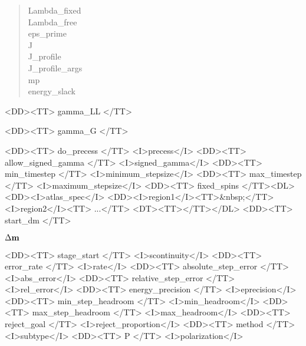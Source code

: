 \begin{description}
\begin{latexonly}
\begin{quote}
    \bi Lambda\_fixed          \\
    \bi Lambda\_free           \\
    \bi eps\_prime             \\
    \bi J                      \\
    \bi J\_profile             \\
    \bi J\_profile\_args       \\
    \bi mp                     \\
    \bi energy\_slack          \\
   \ccb
   \end{quote}
   \end{latexonly}%
   \begin{htmlonly}
   \begin{rawhtml}<BLOCKQUOTE><DL><DT>
   <TT>Specify Oxs_SpinXferEvolve:</TT><I>name</I> <TT>{</TT>
   <DD><TT> alpha </TT>
   \end{rawhtml}
   \abovemath{\alpha}
   \begin{rawhtml}
   <DD><TT> gamma_LL </TT>
   \end{rawhtml}
   \abovemath{\bar{\gamma}}
   \begin{rawhtml}
   <DD><TT> gamma_G </TT>
   \end{rawhtml}
   \abovemath{\gamma}
   \begin{rawhtml}
   <DD><TT> do_precess </TT> <I>precess</I>
   <DD><TT> allow_signed_gamma </TT> <I>signed_gamma</I>
   <DD><TT> min_timestep </TT> <I>minimum_stepsize</I>
   <DD><TT> max_timestep </TT> <I>maximum_stepsize</I>
   <DD><TT> fixed_spins {</TT><DL>
       <DD><I>atlas_spec</I>
       <DD><I>region1</I><TT>&nbsp;</TT><I>region2</I><TT> ...</TT>
       <DT><TT>}</TT></DL>
   <DD><TT> start_dm </TT>
   \end{rawhtml}
   $\Delta \textbf{m}$
   \begin{rawhtml}
   <DD><TT> stage_start </TT> <I>scontinuity</I>
   <DD><TT> error_rate </TT> <I>rate</I>
   <DD><TT> absolute_step_error </TT> <I>abs_error</I>
   <DD><TT> relative_step_error </TT> <I>rel_error</I>
   <DD><TT> energy_precision </TT> <I>eprecision</I>
   <DD><TT> min_step_headroom </TT> <I>min_headroom</I>
   <DD><TT> max_step_headroom </TT> <I>max_headroom</I>
   <DD><TT> reject_goal </TT> <I>reject_proportion</I>
   <DD><TT> method </TT> <I>subtype</I>
   <DD><TT> P </TT> <I>polarization</I>

\end{rawhtml}
\end{htmlonly}
\end{description}
